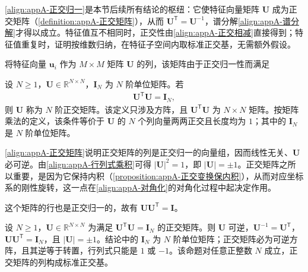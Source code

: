 \documentclass[../main.tex]{subfiles}
\begin{document}
\begin{remark}
\eqref{align:appA-正交归一}是本节后续所有结论的枢纽：它使特征向量矩阵 $\bm{U}$ 成为正交矩阵（\cref{definition:appA-正交矩阵}），从而 $\bm{U}^{\mathsf{T}}=\bm{U}^{-1}$，谱分解\eqref{align:appA-谱分解}才得以成立。特征值互不相同时，正交性由\eqref{align:appA-正交相减}直接得到；特征值重复时，证明按维数归纳，在特征子空间内取标准正交基，无需额外假设。
\end{remark}

将特征向量 $\bm{u}_i$ 作为 $M\times M$ 矩阵 $\bm{U}$ 的列，该矩阵由于正交归一性而满足
\begin{definition}[正交矩阵]\label{definition:appA-正交矩阵}
设 $N\geqslant1$，$\bm{U}\in\mathbb{R}^{N\times N}$，$\bm{I}_{N}$ 为 $N$ 阶单位矩阵。若
\begin{align}
  \bm{U}^{\mathsf{T}}\bm{U}=\bm{I}_{N},
  \label{align:appA-正交矩阵}
\end{align}
则 $\bm{U}$ 称为 $N$ 阶正交矩阵。该定义只涉及方阵，且 $\bm{U}^{\mathsf{T}}\bm{U}$ 为 $N\times N$ 矩阵。按矩阵乘法的定义，该条件等价于 $\bm{U}$ 的 $N$ 个列向量两两正交且长度均为 $1$；其中的 $\bm{I}_{N}$ 是 $N$ 阶单位矩阵。
\end{definition}

\begin{remark}
\eqref{align:appA-正交矩阵}说明正交矩阵的列是正交归一的向量组，因而线性无关、$\bm{U}$ 必可逆。由\eqref{align:appA-行列式乘积}可得 $|\bm{U}|^{2}=1$，即 $|\bm{U}|=\pm1$。正交矩阵之所以重要，是因为它保持内积（\cref{proposition:appA-正交变换保内积}），从而对应坐标系的刚性旋转，这一点在\eqref{align:appA-对角化}的对角化过程中起决定作用。
\end{remark}

这个矩阵的行也是正交归一的，故有 $\bm{U}\bm{U}^{\mathsf{T}}=\bm{I}$。

\begin{proposition}[正交矩阵的行正交性与行列式]\label{proposition:appA-正交矩阵的性质}
设 $N\geqslant1$，$\bm{U}\in\mathbb{R}^{N\times N}$ 为满足 $\bm{U}^{\mathsf{T}}\bm{U}=\bm{I}_{N}$ 的正交矩阵。则 $\bm{U}$ 可逆，$\bm{U}^{-1}=\bm{U}^{\mathsf{T}}$，$\bm{U}\bm{U}^{\mathsf{T}}=\bm{I}_{N}$，且 $|\bm{U}|=\pm1$。结论中的 $\bm{I}_{N}$ 为 $N$ 阶单位矩阵；正交矩阵必为可逆方阵，且其逆等于转置，行列式只能是 $1$ 或 $-1$。该命题对任意正整数 $N$ 成立，正交矩阵的列构成标准正交基。
\end{proposition}
\end{document}
